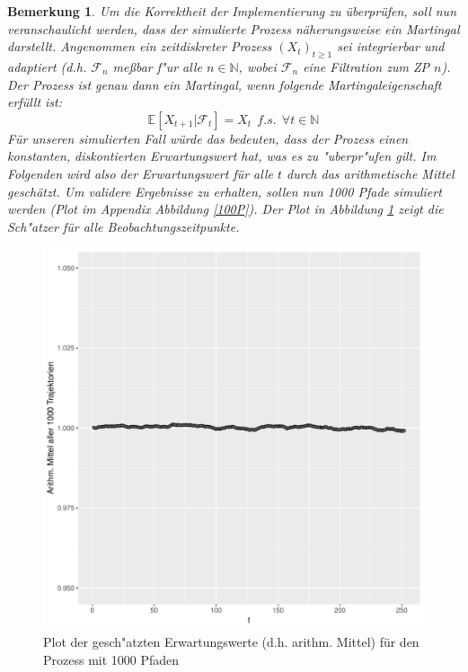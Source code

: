 \documentclass[10pt,a4paper]{article}\usepackage[]{graphicx}\usepackage[]{color}
\makeatletter
\def\maxwidth{ %
  \ifdim\Gin@nat@width>\linewidth
    \linewidth
  \else
    \Gin@nat@width
  \fi
}
\newtheorem{mybem}{Bemerkung}
\makeatother
\begin{document}
\begin{mybem}
Um die Korrektheit der Implementierung zu überprüfen, soll nun veranschaulicht werden, dass der simulierte Prozess näherungsweise ein Martingal darstellt. Angenommen ein zeitdiskreter Prozess $(X_t)_{t\geq 1}$ sei integrierbar und adaptiert (d.h. $\mathcal{F}_n$ meßbar f"ur alle $n \in \mathbb{N}$, wobei $\mathcal{F}_n$ eine Filtration zum ZP $n$). Der Prozess ist genau dann ein Martingal, wenn folgende Martingaleigenschaft erfüllt ist:
\[ \mathbb{E}\left[X_{t+1}| \mathcal{F}_t\right]=X_t \ \ f.s.\ \ \forall t \in \mathbb{N}\]
Für unseren simulierten Fall würde das bedeuten, dass der Prozess einen konstanten, diskontierten Erwartungswert hat, was es zu "uberpr"ufen gilt. Im Folgenden wird also der Erwartungswert für alle $t$ durch das arithmetische Mittel geschätzt. Um validere Ergebnisse zu erhalten, sollen nun 1000 Pfade simuliert werden (Plot im Appendix Abbildung \ref{100P}). Der Plot in Abbildung \ref{EWfig} zeigt die Sch"atzer für alle Beobachtungszeitpunkte. 
\end{mybem}

\begin{figure}[H]

\includegraphics[width=\maxwidth]{figure/unnamed-chunk-15-1} 

\caption{Plot der gesch"atzten Erwartungswerte (d.h. arithm. Mittel) für den Prozess mit 1000 Pfaden}
\label{EWfig}
\end{figure}
\end{document}
